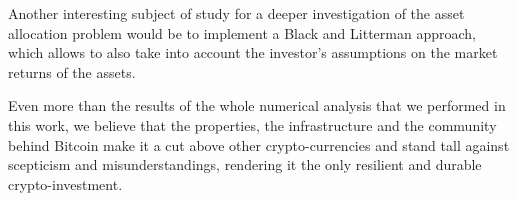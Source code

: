 Another interesting subject of study for a deeper investigation of the asset allocation problem would be to implement a Black and Litterman approach, which allows to also take into account the investor's assumptions on the market returns of the assets.


\bigskip
Even more than the  results of the whole numerical analysis that we performed in this work, we believe that the properties, the  infrastructure and the community behind Bitcoin make it a cut above other crypto-currencies and stand tall against scepticism and misunderstandings, rendering it the only resilient and durable crypto-investment.
 
\bigskip



%
%
